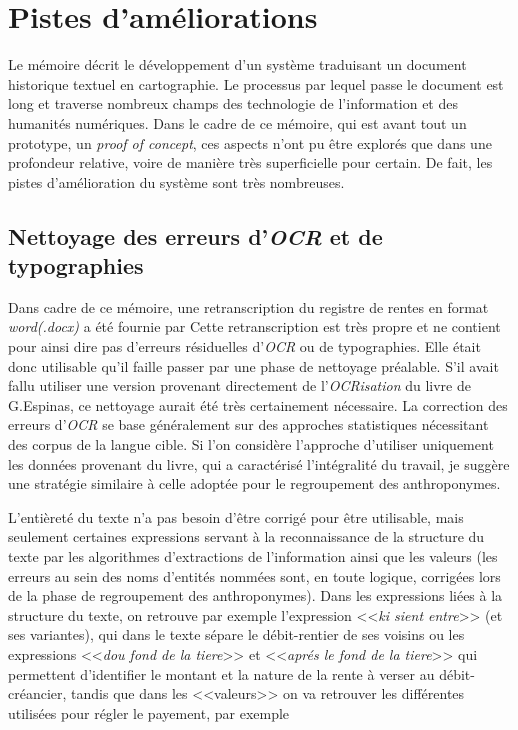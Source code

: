 \section{Pistes d'améliorations}
Le mémoire décrit le développement d'un système traduisant un document historique textuel en cartographie. Le processus par lequel passe le document est long  et traverse nombreux champs des technologie de l'information et des humanités numériques. Dans le cadre de ce  mémoire, qui est avant tout un prototype, un \textit{proof of concept}, ces aspects n'ont pu être explorés que dans une profondeur relative, voire de manière très superficielle pour certain. De fait, les pistes d'amélioration du système sont très nombreuses.

\subsection{Nettoyage des erreurs d'\textit{OCR} et de typographies}
Dans cadre de ce mémoire, une retranscription du registre de rentes en format  \textit{word(.docx)} a été fournie par %
Cette retranscription est très propre et  ne contient pour ainsi dire pas d'erreurs résiduelles d'\textit{OCR} ou de typographies. Elle était donc utilisable qu'il faille passer par une phase de nettoyage préalable. S'il avait fallu utiliser une version provenant directement de l'\textit{OCRisation} du livre de G.Espinas, ce nettoyage aurait été très certainement nécessaire. 
La correction des erreurs d'\textit{OCR} se base généralement sur des approches statistiques nécessitant des corpus de la langue cible. Si l'on considère l'approche d'utiliser uniquement les données provenant du livre, qui a caractérisé l'intégralité du travail, je suggère une stratégie similaire à celle adoptée pour le regroupement des anthroponymes.

L'entièreté du texte n'a pas besoin d'être corrigé pour être utilisable, mais seulement certaines expressions servant à la reconnaissance de la structure du texte par les algorithmes d'extractions de l'information ainsi que les valeurs (les erreurs au sein des noms d'entités nommées sont, en toute logique, corrigées lors de la phase de regroupement des anthroponymes). Dans les expressions liées à la structure du texte, on retrouve par exemple l'expression <<\textit{ki sient entre}>> (et ses variantes), qui dans le texte sépare le débit-rentier de ses voisins ou  les expressions <<\textit{dou fond de la tiere}>> et <<\textit{aprés le fond de la tiere}>>  qui permettent d'identifier le montant et la nature de la rente à verser au débit-créancier, tandis que dans les <<valeurs>> on va retrouver les différentes utilisées pour régler le payement, par exemple %


